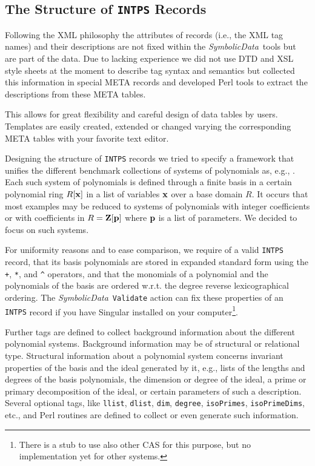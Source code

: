 \documentclass[11pt]{article}
\newcommand{\SD}{{\em Symbo\-lic\-Data}}
\begin{document}
\subsection{The Structure of {\tt INTPS} Records}

Following the XML philosophy the attributes of records (i.e., the XML
tag names) and their descriptions are not fixed within the \SD\ tools
but are part of the data.  Due to lacking experience we did not use
DTD and XSL style sheets at the moment to describe tag syntax and
semantics but collected this information in special META records and
developed Perl tools to extract the descriptions from these META
tables.

This allows for great flexibility and careful design of data tables by
users. Templates are easily created, extended or changed varying the
corresponding META tables with your favorite text editor.

Designing the structure of {\tt INTPS} records we tried to
specify a framework that unifies the different benchmark
collections of systems of polynomials as, e.g., \cite{Bini,
Boege_86a, Czapor_86a, PoSSo, Wang_92a, Wang_96a}.  Each such
system of polynomials is defined through a finite basis in a
certain polynomial ring $R[{\bf x}]$ in a list of variables ${\bf
x}$ over a base domain $R$. It occurs that most examples may be
reduced to systems of polynomials with integer coefficients or
with coefficients in $R={\bf Z}[{\bf p}]$ where ${\bf p}$ is a
list of parameters. We decided to focus on such systems.

For uniformity reasons and to ease comparison, we require of a valid
{\tt INTPS} record, that its basis polynomials are stored in expanded
standard form using the \verb?+?, \verb?*?, and \verb?^?  operators,
and that the monomials of a polynomial and the polynomials of the
basis are ordered w.r.t. the degree reverse lexicographical ordering.
The \SD\ {\tt Validate} action can fix these properties of an {\tt
INTPS} record if you have {\sc Singular} \cite{Singular} installed on
your computer\footnote{There is a stub to use also other CAS for this
purpose, but no implementation yet for other systems.}.

Further tags are defined to collect background information about the
different polynomial systems. Background information may be of
structural or relational type. Structural information about a
polynomial system concerns invariant properties of the basis and the
ideal generated by it, e.g., lists of the lengths and degrees of the
basis polynomials, the dimension or degree of the ideal, a prime or
primary decomposition of the ideal, or certain parameters of such a
description.  Several optional tags, like {\tt llist}, {\tt dlist},
{\tt dim}, {\tt degree}, {\tt isoPrimes}, {\tt isoPrimeDims}, etc.,
and Perl routines are defined to collect or even generate such
information.
\end{document}
